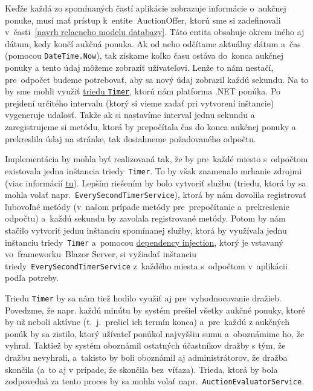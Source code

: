 Keďže každá zo spomínaných častí aplikácie zobrazuje informácie o~aukčnej ponuke, musí mať prístup k~entite~AuctionOffer, ktorú sme si zadefinovali v~časti~\ref{navrh relacneho modelu databazy}. Táto entita obsahuje okrem iného aj dátum, kedy končí aukčná ponuka. Ak od neho odčítame aktuálny dátum a~čas (pomocou \verb|DateTime.Now|), tak získame koľko času ostáva do~konca aukčnej ponuky a tento údaj môžeme zobraziť užívateľovi. Lenže to nám nestačí, pre~odpočet budeme potrebovať, aby sa nový údaj zobrazil každú sekundu. Na to by sme mohli využiť \href{https://learn.microsoft.com/en-us/dotnet/api/system.timers.timer?view=net-6.0}{triedu \texttt{Timer}}, ktorú nám platforma .NET ponúka. Po prejdení určitého intervalu (ktorý si vieme zadať pri vytvorení inštancie) vygeneruje udalosť. Takže ak si nastavíme interval jednu sekundu a zaregistrujeme si metódu, ktorá by prepočítala čas do konca aukčnej ponuky a prekreslila údaj na stránke, tak dosiahneme požadovaného odpočtu.

Implementácia by mohla byť realizovaná tak, že by pre~každé miesto s~odpočtom existovala jedna inštancia triedy~\verb|Timer|. To by však znamenalo mrhanie zdrojmi (viac informácií \href{https://learn.microsoft.com/en-us/dotnet/api/system.threading.timer.dispose?view=net-6.0}{tu}). Lepším riešením by bolo vytvoriť službu (triedu, ktorá by sa mohla volať napr.~\verb|EverySecondTimerService|), ktorá by nám dovolila registrovať ľubovoľné metódy (v~našom prípade metódy pre~prepočítanie a~prekreslenie odpočtu) a~každú sekundu by zavolala registrované metódy. Potom by nám stačilo vytvoriť jednu inštanciu spomínanej služby, ktorá by využívala jednu inštanciu triedy~\verb|Timer| a~pomocou \href{https://learn.microsoft.com/en-us/aspnet/core/blazor/fundamentals/dependency-injection}{dependency injection}, ktorý je vstavaný vo~frameworku~Blazor Server, si vyžiadať inštanciu triedy~\verb|EverySecondTimerService| z~každého miesta s~odpočtom v~aplikácii podľa potreby.

Triedu \verb|Timer| by sa nám tiež hodilo využiť aj pre~vyhodnocovanie dražieb. Povedzme, že napr. každú minútu by systém prešiel všetky aukčné ponuky, ktoré by už neboli aktívne (t.~j.~prešiel ich termín konca) a~pre~každú z aukčných ponúk by sa zistilo, ktorý užívateľ ponúkol najvyššiu sumu a~oboznámime ho, že vyhral. Taktiež by systém oboznámil ostatných účastníkov dražby s tým, že dražbu nevyhrali, a~takisto by boli oboznámil aj administrátorov, že dražba skončila (a~to aj v prípade, že skončila bez~víťaza). Trieda, ktorá by bola zodpovedná za tento proces by sa mohla volať napr.~\verb|AuctionEvaluatorService|.

